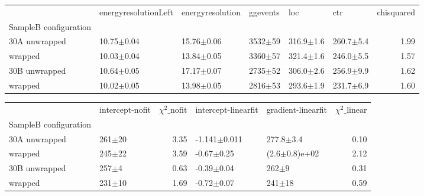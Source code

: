 \begin{tabular}{llllllr}
\hline
{} & energyresolutionLeft & energyresolution &     ggevents &            loc &            ctr &  chisquared \\
SampleB configuration &                      &                  &              &                &                &             \\
\hline
30A     unwrapped     &       10.75$\pm$0.04 &   15.76$\pm$0.06 &  3532$\pm$59 &  316.9$\pm$1.6 &  260.7$\pm$5.4 &        1.99 \\
        wrapped       &       10.03$\pm$0.04 &   13.84$\pm$0.05 &  3360$\pm$57 &  321.4$\pm$1.6 &  246.0$\pm$5.5 &        1.57 \\
30B     unwrapped     &       10.64$\pm$0.05 &   17.17$\pm$0.07 &  2735$\pm$52 &  306.0$\pm$2.6 &  256.9$\pm$9.9 &        1.62 \\
        wrapped       &       10.02$\pm$0.05 &   13.98$\pm$0.05 &  2816$\pm$53 &  293.6$\pm$1.9 &  231.7$\pm$6.9 &        1.60 \\
\hline
\end{tabular}

\begin{tabular}{llrllr}
\hline
{} & intercept-nofit &  $\chi^2\_\text{nofit}$ & intercept-linearfit & gradient-linearfit &  $\chi^2\_\text{linear}$ \\
SampleB configuration &                 &                        &                     &                    &                         \\
\hline
30A     unwrapped     &      261$\pm$20 &                   3.35 &    -1.141$\pm$0.011 &      277.8$\pm$3.4 &                    0.10 \\
        wrapped       &      245$\pm$22 &                   3.59 &      -0.67$\pm$0.25 &  (2.6$\pm$0.8)e+02 &                    2.12 \\
30B     unwrapped     &       257$\pm$4 &                   0.63 &      -0.39$\pm$0.04 &          262$\pm$9 &                    0.31 \\
        wrapped       &      231$\pm$10 &                   1.69 &      -0.72$\pm$0.07 &         241$\pm$18 &                    0.59 \\
\hline
\end{tabular}